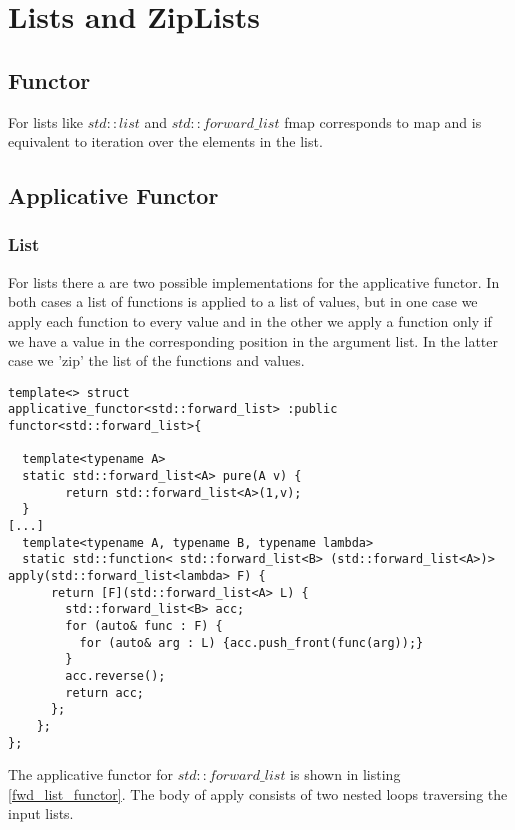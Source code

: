 \documentclass[12pt,fleqn]{article}
\begin{document}
\section{Lists and ZipLists}
%
%
\subsection{Functor}

For lists like $std::list$ and $std::forward\_list$ fmap corresponds to map and is equivalent to iteration over the elements in the list.

  
%
%
\subsection{Applicative Functor}
%
%

\subsubsection{List}
%
For lists there a are two possible implementations for the applicative functor.
In both cases a list of functions is applied to a list of values, but in one case we apply each function to every value and in the other we apply a function 
only if we have a value in the corresponding position in the argument list. 
In the latter case we 'zip' the list of the functions and values.

%
%
\begin{minipage}{\linewidth}
\begin{lstlisting}[caption=std::forward\_list is an applicative functor, label=fwd_list_functor]
template<> struct 
applicative_functor<std::forward_list> :public functor<std::forward_list>{

  template<typename A>
  static std::forward_list<A> pure(A v) {
		return std::forward_list<A>(1,v);
  }
[...]
  template<typename A, typename B, typename lambda>
  static std::function< std::forward_list<B> (std::forward_list<A>)> apply(std::forward_list<lambda> F) {
      return [F](std::forward_list<A> L) {
	    std::forward_list<B> acc;
	    for (auto& func : F) {
	      for (auto& arg : L) {acc.push_front(func(arg));}
        } 
	    acc.reverse();
	    return acc;
      };
    };
};
\end{lstlisting}
\end{minipage}
%
%
%
The applicative functor for $std::forward\_list$ is shown in listing \ref{fwd_list_functor}.
The body of apply consists of two nested loops traversing the input lists. 
%
\end{document}
